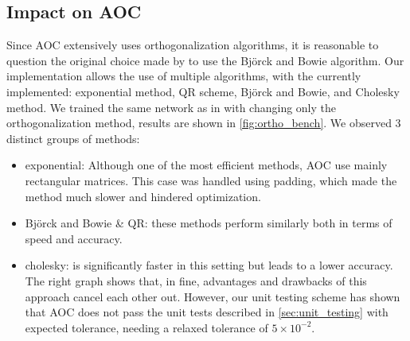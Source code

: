 
    \subsection{Impact on AOC}

    Since AOC extensively uses orthogonalization algorithms, it is reasonable to question the original choice made by \cite{li_preventing_2019, serrurier_explainable_nodate} to use the Björck and Bowie algorithm. Our implementation allows the use of multiple algorithms, with the currently implemented: exponential method, QR scheme, Björck and Bowie, and Cholesky method. We trained the same network as in \cite{li_preventing_2019} with changing only the orthogonalization method, results are shown in \cref{fig:ortho_bench}. We observed 3 distinct groups of methods:
    \begin{itemize}
        \item exponential: Although one of the most efficient methods, AOC use mainly rectangular matrices. This case was handled using padding, which made the method much slower and hindered optimization.
        \item Björck and Bowie \& QR: these methods perform similarly both in terms of speed and accuracy.
        \item cholesky: is significantly faster in this setting but leads to a lower accuracy. The right graph shows that, in fine, advantages and drawbacks of this approach cancel each other out. However, our unit testing scheme has shown that AOC does not pass the unit tests described in  \cref{sec:unit_testing} with expected tolerance, needing a relaxed tolerance of $5\times 10^{-2}$.
    \end{itemize}
    
